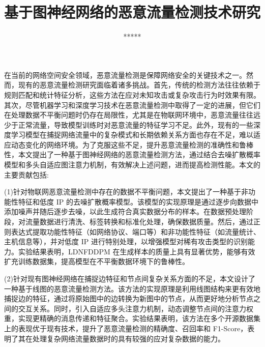 \documentclass[promaster]{thesis-uestc}
\title{基于图神经网络的恶意流量检测技术研究}{Research on Malicious Traffic Detection Technology Based on Graph Neural Networks
}
\author{*****}{*****}
\begin{document}
\makecover
\begin{chineseabstract}
在当前的网络空间安全领域，恶意流量检测是保障网络安全的关键技术之一。然而，现有的恶意流量检测研究面临着诸多挑战。首先，传统的检测方法往往依赖于规则匹配和统计特征分析，这些方法在应对未知攻击或复杂攻击行为时效果有限。其次，尽管机器学习和深度学习技术在恶意流量检测中取得了一定的进展，但它们在处理数据不平衡问题时仍存在局限性，尤其是在物联网环境中，恶意流量往往远少于正常流量，导致模型训练时对恶意流量的特征学习不足。此外，现有的一些深度学习模型在捕捉网络流量中的复杂模式和长期依赖关系方面也存在不足，难以适应动态变化的网络环境。为了克服这些不足，提升恶意流量检测的准确性和鲁棒性，本文提出了一种基于图神经网络的恶意流量检测方法，通过结合去噪扩散概率模型和多头自适应图注意力机制，有效解决上述问题，进而提高检测性能。本文的主要贡献包括:

(1)针对物联网恶意流量检测中存在的数据不平衡问题，本文提出了一种基于非功能性特征和低度 IP 的去噪扩散概率模型。该模型的实现原理是通过逐步向数据中添加噪声并随后逐步去噪，以此生成符合真实数据分布的样本。在数据预处理阶段，对流量数据进行清洗、标签转换和标准化处理，确保数据质量。然后，通过正则表达式提取功能性特征（如网络协议、端口等）和非功能性特征（如流量统计、主机信息等），并对低度 IP 进行特别处理，以增强模型对稀有攻击类型的识别能力。实验结果表明，LDNFDDPM 在生成样本的质量上具有显著优势，能够有效扩充训练数据集，提高模型在不平衡数据环境下的鲁棒性。

(2)针对现有图神经网络在捕捉边特征和节点间复杂关系方面的不足，本文设计了一种基于线图的恶意流量检测方法。该方法的实现原理是利用线图结构来更有效地捕捉边的特征，通过将原始图中的边转换为新图中的节点，从而更好地分析节点之间的交互关系。同时，引入自适应多头注意力机制，动态调整节点间的注意力权重，实现更精确的消息传递和特征聚合。实验结果表明，该方法在多个开源数据集上的表现优于现有技术，提升了恶意流量检测的精确度、召回率和 F1-Score，表明了其在处理复杂网络流量数据时的具有较强的应对复杂数据的能力。


\end{chineseabstract}
\end{document}
